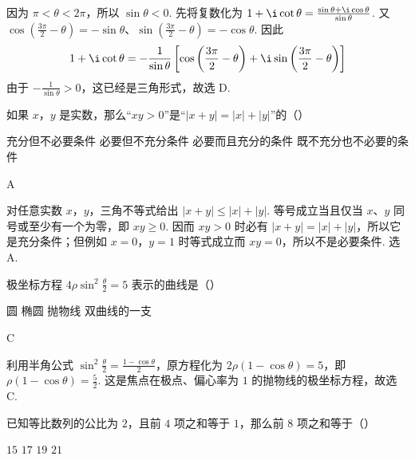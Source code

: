 \begin{solution}
因为 \(\pi<\theta<2\pi\)，所以 \(\sin\theta<0\). 先将复数化为
\(1+\i\cot\theta=\frac{\sin\theta+\i\cos\theta}{\sin\theta}\).
又
\(\cos\left(\frac{3\pi}{2}-\theta\right)=-\sin\theta\)、\(\sin\left(\frac{3\pi}{2}-\theta\right)=-\cos\theta\).
因此
\[
1+\i\cot\theta
=-\frac{1}{\sin\theta}
\left[
\cos\left(\frac{3\pi}{2}-\theta\right)
+\i\sin\left(\frac{3\pi}{2}-\theta\right)
\right]
\]
由于 \(-\frac{1}{\sin\theta}>0\)，这已经是三角形式，故选 D.
\end{solution}

\begin{problem}
如果 \(x\)，\(y\) 是实数，那么“\(xy>0\)”是“\(|x+y|=|x|+|y|\)”的（\quad）

\choices
    {充分但不必要条件}
    {必要但不充分条件}
    {必要而且充分的条件}
    {既不充分也不必要的条件}
\end{problem}

\begin{answer}
A
\end{answer}

\begin{solution}
对任意实数 \(x\)，\(y\)，三角不等式给出
\(|x+y|\leqslant |x|+|y|\).
等号成立当且仅当 \(x\)、\(y\) 同号或至少有一个为零，即 \(xy\geqslant0\). 因而 \(xy>0\) 时必有 \(|x+y|=|x|+|y|\)，所以它是充分条件；但例如 \(x=0\)，\(y=1\) 时等式成立而 \(xy=0\)，所以不是必要条件. 选 A.
\end{solution}

\begin{problem}
极坐标方程 \(4\rho\sin^2\frac{\theta}{2}=5\) 表示的曲线是（\quad）

\choices
    {圆}
    {椭圆}
    {抛物线}
    {双曲线的一支}
\end{problem}

\begin{answer}
C
\end{answer}

\begin{solution}
利用半角公式
\(\sin^2\frac{\theta}{2}=\frac{1-\cos\theta}{2}\)，原方程化为 \(2\rho(1-\cos\theta)=5\)，即 \(\rho(1-\cos\theta)=\frac{5}{2}\).
这是焦点在极点、偏心率为 \(1\) 的抛物线的极坐标方程，故选 C.
\end{solution}

\begin{problem}
已知等比数列的公比为 \(2\)，且前 \(4\) 项之和等于 \(1\)，那么前 \(8\) 项之和等于（\quad）

\choices
    {\(15\)}
    {\(17\)}
    {\(19\)}
    {\(21\)}
\end{problem}

